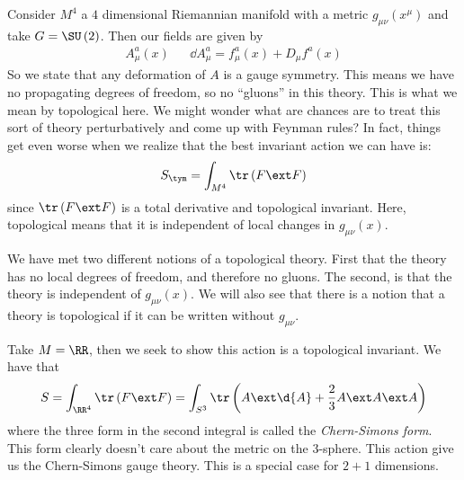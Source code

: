 \documentclass{booc}
\begin{document}
Consider $M^4$ a $4$ dimensional Riemannian manifold 
with a metric $g_{\mu\nu}\left( x^{\mu} \right)$
and take $G = \SU\left( 2 \right)$.
Then our fields are given by
\begin{align}
A_\mu^a \left( x \right) &&
\dd A_\mu^a = f_\mu^a\left( x \right) + D_\mu f^a\left( x \right)
\end{align}
So we state that any deformation of $A$ is a gauge symmetry.
This means we have no propagating degrees of freedom, 
so no ``gluons'' in this theory. 
This is what we mean by topological here.
We might wonder what are chances are to treat this sort of theory 
perturbatively and come up with Feynman rules?
In fact, things get even worse
when we realize that the best invariant action we can have is:
\begin{equation}
S_{\tym} = \int_{M^4} \tr\left( F\ext F \right)
\end{equation}
since $\tr\left( F\ext F \right)$ is a total derivative and topological invariant.
Here, topological means that it is independent of local changes in $g_{\mu\nu}\left( x \right)$. 

\begin{wrn}
We have met two different notions of a topological theory.
First that the theory has no local degrees of freedom, and therefore no gluons. 
The second, is that the theory is independent of
$g_{\mu\nu}\left( x \right)$. 
We will also see that there is a notion that a theory is topological if it can be
written without $g_{\mu\nu}$.
\end{wrn}

\begin{exm}
Take $M = \RR$, then we seek to show this action is a topological invariant. 
We have that
\begin{equation}
S = \int_{\RR^4} \tr\left( F\ext F \right) = 
\int_{S^3} \tr \left( A\ext \d{A} + \frac{2}{3} A\ext A\ext A \right)
\end{equation}
where the three form in the second integral is called the \emph{Chern-Simons form}.
This form clearly doesn't care about the metric on the $3$-sphere.
This action give us the Chern-Simons gauge theory. This is a special case for $2 + 1$ dimensions. 
\end{exm}
\end{document}
